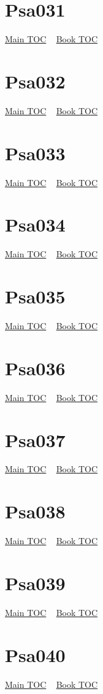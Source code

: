 \documentclass{book}
\begin{document}
  \section{Psa031}\hyperlink{toc}{Main TOC} ~ \hyperref[subsec:Psa]{Book TOC} 
  \section{Psa032}\hyperlink{toc}{Main TOC} ~ \hyperref[subsec:Psa]{Book TOC} 
  \section{Psa033}\hyperlink{toc}{Main TOC} ~ \hyperref[subsec:Psa]{Book TOC} 
  \section{Psa034}\hyperlink{toc}{Main TOC} ~ \hyperref[subsec:Psa]{Book TOC} 
  \section{Psa035}\hyperlink{toc}{Main TOC} ~ \hyperref[subsec:Psa]{Book TOC} 
  \section{Psa036}\hyperlink{toc}{Main TOC} ~ \hyperref[subsec:Psa]{Book TOC} 
  \section{Psa037}\hyperlink{toc}{Main TOC} ~ \hyperref[subsec:Psa]{Book TOC} 
  \section{Psa038}\hyperlink{toc}{Main TOC} ~ \hyperref[subsec:Psa]{Book TOC} 
  \section{Psa039}\hyperlink{toc}{Main TOC} ~ \hyperref[subsec:Psa]{Book TOC} 
  \section{Psa040}\hyperlink{toc}{Main TOC} ~ \hyperref[subsec:Psa]{Book TOC} 
\end{document}
